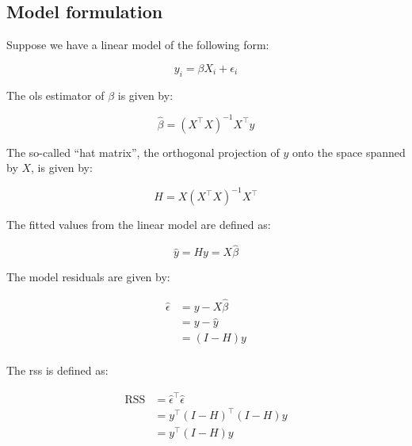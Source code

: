 \documentclass{report}
\begin{document}
\subsection{Model formulation}

Suppose we have a linear model of the following form:

\begin{equation}\label{eq:ols-model}
    y_i = \beta X_i + \epsilon_i
\end{equation}

The \gls{ols} estimator of $\beta$ is given by:

\begin{equation}\label{eq:ols-beta-est}
    \hat{\beta} = (X^\intercal X)^{-1}X^\intercal y
\end{equation}

The so-called ``hat matrix'', the orthogonal projection of $y$ onto the space spanned by $X$, is given by:

\begin{equation}\label{eq:ols-hat-matrix}
    H = X(X^\intercal X)^{-1} X^\intercal
\end{equation}

The fitted values from the linear model are defined as: 

\begin{equation}\label{eq:ols-fitted-vals}
    \hat{y} = Hy = X\hat{\beta}
\end{equation}

The model residuals are given by:

\begin{equation}\label{eq:ols-residuals}
    \begin{aligned}
        \hat{\epsilon}
          &= y - X\hat{\beta} \\
          &= y - \hat{y} \\
          &= (I - H)y \\
    \end{aligned}
\end{equation}

The \gls{rss} is defined as:

\begin{equation}\label{eq:ols-rss}
    \begin{aligned}
        \text{RSS}
          &= \hat{\epsilon}^\intercal\hat{\epsilon} \\
          &= y^\intercal (I - H)^\intercal (I - H) y \\
          &= y^\intercal (I - H) y \\
    \end{aligned}
\end{equation}
\end{document}
